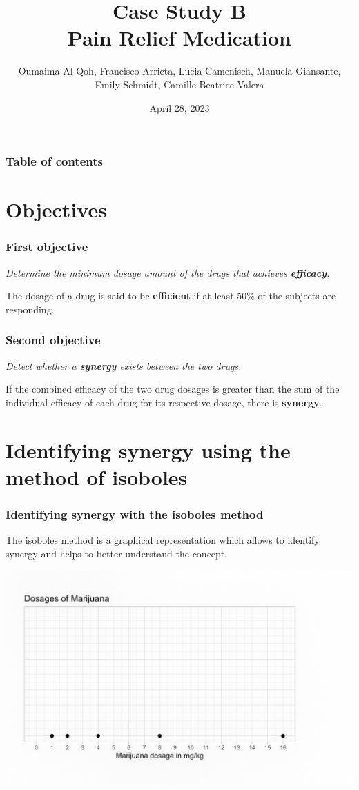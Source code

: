 \documentclass[14pt]{beamer}
\author{Oumaima Al Qoh, Francisco Arrieta, Lucia Camenisch, Manuela Giansante, Emily Schmidt, Camille Beatrice Valera}
\title{Case Study B \\ Pain Relief Medication}
\date{April 28, 2023}
\begin{document}
\begin{frame}
\titlepage
\end{frame}



\begin{frame}
\frametitle{Table of contents}
\tableofcontents
\end{frame}


\section{Objectives}
\begin{frame}
\frametitle{First objective}
\textit{Determine the minimum dosage amount of the drugs that achieves \textbf{efficacy}.}

\bigskip

The dosage of a drug is said to be \textbf{efficient} if at least 50\% of the subjects are responding.
\end{frame}


\begin{frame}
\frametitle{Second objective}
\textit{Detect whether a \textbf{synergy} exists between the two drugs.}

\bigskip

If the combined efficacy of the two drug dosages is greater than the sum of the individual efficacy of each drug for its respective dosage, there is \textbf{synergy}.
\end{frame}


\section{Identifying synergy using the method of isoboles}
\begin{frame}
\frametitle{Identifying synergy with the isoboles method}
The isoboles method is a graphical representation which allows to identify synergy and helps to better understand the concept.
\end{frame}

\begin{frame}
\begin{center}
\includegraphics[scale=0.24]{img1.png}
\end{center}
\end{frame}
\end{document}
